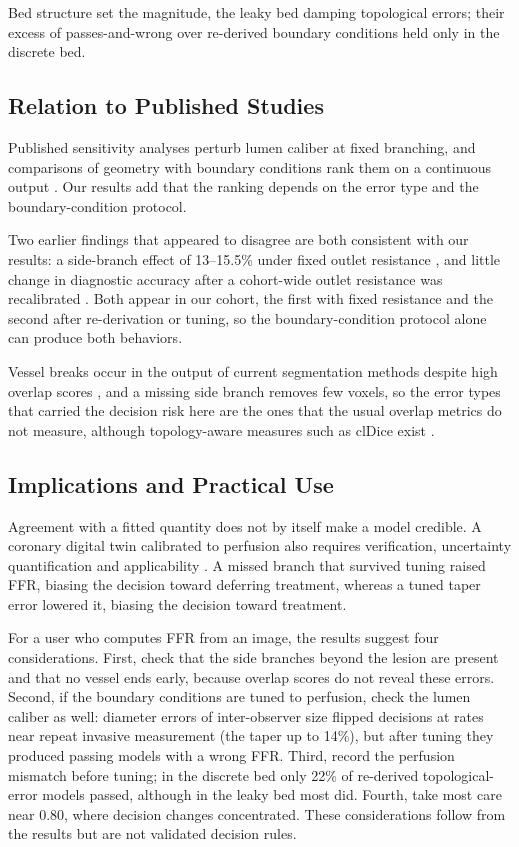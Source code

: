 \documentclass[journal,twoside,web]{ieeecolor}
\begin{document}
Bed structure set the magnitude, the leaky bed damping topological errors; their excess of passes-and-wrong over
re-derived boundary conditions held only in the discrete bed.

\subsection{Relation to Published Studies}
Published sensitivity analyses perturb lumen caliber at fixed branching, and comparisons of geometry with boundary
conditions rank them on a continuous output \cite{sankaran2016,tanade2022,korte2023}. Our results add that the
ranking depends on the error type and the boundary-condition protocol.

Two earlier findings that appeared to disagree are both consistent with our results: a side-branch effect of 13--15.5\% under fixed
outlet resistance \cite{gamage2022}, and little change in diagnostic accuracy after a cohort-wide outlet resistance
was recalibrated \cite{gosling2020}. Both appear in our cohort, the first with fixed resistance and the second after re-derivation or tuning, so the boundary-condition protocol alone can
produce both behaviors.

Vessel breaks occur in the output of current segmentation methods despite high overlap scores \cite{bransby2026},
and a missing side branch removes few voxels, so the error types that carried the decision risk here are the ones that the usual overlap metrics do not measure, although topology-aware measures such as clDice
exist \cite{shit2021}.

\subsection{Implications and Practical Use}
Agreement with a fitted quantity does not by itself make a model credible. A coronary digital twin calibrated to perfusion also requires verification,
uncertainty quantification and applicability \cite{viceconti2025}. A missed branch that survived tuning raised FFR, biasing the decision toward
deferring treatment, whereas a tuned taper error lowered it, biasing the decision toward treatment.

For a user who computes FFR from an image, the results suggest four considerations. First, check that the side branches
beyond the lesion are present and that no vessel ends early, because overlap scores do not reveal these errors.
Second, if the boundary conditions are tuned to perfusion, check the lumen caliber as well: diameter errors of
inter-observer size flipped decisions at rates near repeat invasive measurement (the taper up to 14\%), but after
tuning they produced passing models with a wrong FFR. Third, record the perfusion mismatch before tuning; in the discrete bed
only 22\% of re-derived topological-error models passed, although in the leaky bed most did. Fourth, take most care near 0.80,
where decision changes concentrated. These considerations follow from the results
but are not validated decision rules.
\end{document}
